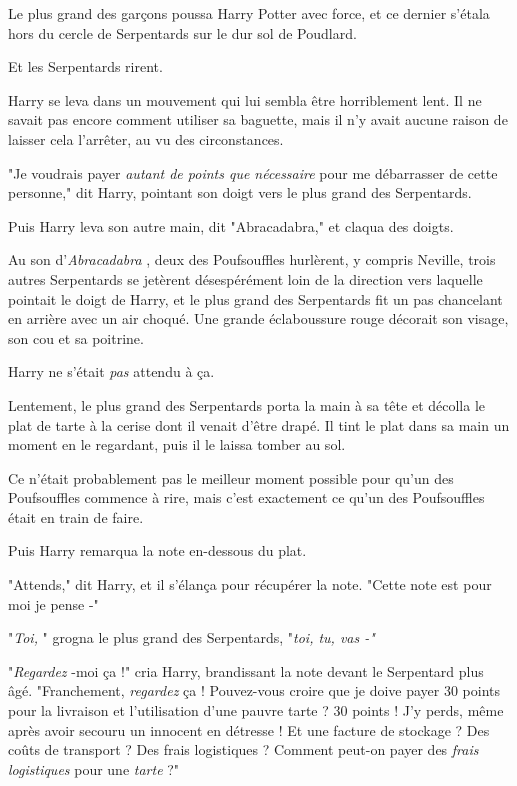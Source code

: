 Le plus grand des garçons poussa Harry Potter avec force, et ce dernier s'étala hors du cercle de Serpentards sur le dur sol de Poudlard.

Et les Serpentards rirent.

Harry se leva dans un mouvement qui lui sembla être horriblement lent. Il ne savait pas encore comment utiliser sa baguette, mais il n'y avait aucune raison de laisser cela l'arrêter, au vu des circonstances.

"Je voudrais payer \emph{autant de points que nécessaire}  pour me débarrasser de cette personne," dit Harry, pointant son doigt vers le plus grand des Serpentards.

Puis Harry leva son autre main, dit "Abracadabra," et claqua des doigts.

Au son d'\emph{Abracadabra} , deux des Poufsouffles hurlèrent, y compris Neville, trois autres Serpentards se jetèrent désespérément loin de la direction vers laquelle pointait le doigt de Harry, et le plus grand des Serpentards fit un pas chancelant en arrière avec un air choqué. Une grande éclaboussure rouge décorait son visage, son cou et sa poitrine.

Harry ne s'était \emph{pas}  attendu à ça.

Lentement, le plus grand des Serpentards porta la main à sa tête et décolla le plat de tarte à la cerise dont il venait d'être drapé. Il tint le plat dans sa main un moment en le regardant, puis il le laissa tomber au sol.

Ce n'était probablement pas le meilleur moment possible pour qu'un des Poufsouffles commence à rire, mais c'est exactement ce qu'un des Poufsouffles était en train de faire.

Puis Harry remarqua la note en-dessous du plat.

"Attends," dit Harry, et il s'élança pour récupérer la note. "Cette note est pour moi je pense -"

"\emph{Toi,} " grogna le plus grand des Serpentards, "\emph{toi, tu, vas -"} 

"\emph{Regardez} -moi ça !" cria Harry, brandissant la note devant le Serpentard plus âgé. "Franchement, \emph{regardez}  ça ! Pouvez-vous croire que je doive payer 30 points pour la livraison et l'utilisation d'une pauvre tarte ? 30 points ! J'y perds, même après avoir secouru un innocent en détresse ! Et une facture de stockage ? Des coûts de transport ? Des frais logistiques ? Comment peut-on payer des \emph{frais logistiques}  pour une \emph{tarte}  ?"

